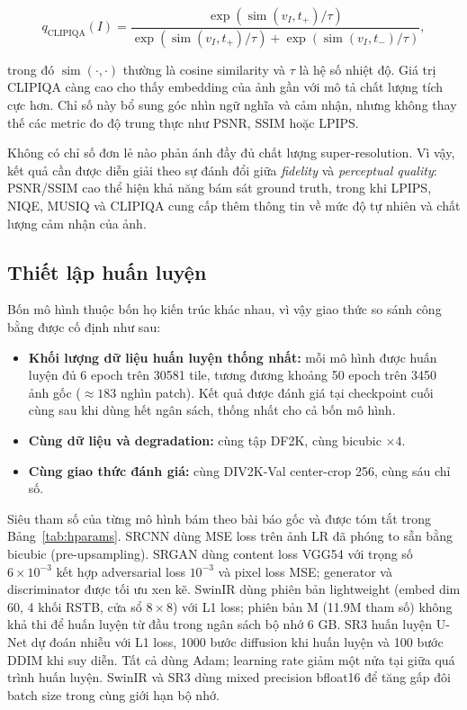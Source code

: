 \begin{equation}
q_{\mathrm{CLIPIQA}}(I)
=\frac{\exp\!\left(\operatorname{sim}(v_I,t_{+})/\tau\right)}
{\exp\!\left(\operatorname{sim}(v_I,t_{+})/\tau\right)
+\exp\!\left(\operatorname{sim}(v_I,t_{-})/\tau\right)},
\end{equation}

trong đó $\operatorname{sim}(\cdot,\cdot)$ thường là cosine similarity và $\tau$
là hệ số nhiệt độ. Giá trị CLIPIQA càng cao cho thấy embedding của ảnh gần với
mô tả chất lượng tích cực hơn. Chỉ số này bổ sung góc nhìn ngữ nghĩa và cảm
nhận, nhưng không thay thế các metric đo độ trung thực như PSNR, SSIM hoặc LPIPS.


Không có chỉ số đơn lẻ nào phản ánh đầy đủ chất lượng super-resolution. Vì vậy,
kết quả cần được diễn giải theo sự đánh đổi giữa \textit{fidelity} và
\textit{perceptual quality}: PSNR/SSIM cao thể hiện khả năng bám sát ground
truth, trong khi LPIPS, NIQE, MUSIQ và CLIPIQA cung cấp thêm thông tin về mức độ
tự nhiên và chất lượng cảm nhận của ảnh.

\subsection{Thiết lập huấn luyện}
\label{sec:training-setup}

Bốn mô hình thuộc bốn họ kiến trúc khác nhau, vì vậy giao thức so sánh công bằng
được cố định như sau:

\begin{itemize}
\item \textbf{Khối lượng dữ liệu huấn luyện thống nhất:} mỗi mô hình được huấn
      luyện đủ 6 epoch trên 30581 tile, tương đương khoảng 50 epoch trên 3450 ảnh
      gốc ($\approx 183$ nghìn patch). Kết quả được đánh giá tại checkpoint cuối
      cùng sau khi dùng hết ngân sách, thống nhất cho cả bốn mô hình.
\item \textbf{Cùng dữ liệu và degradation:} cùng tập DF2K, cùng bicubic $\times 4$.
\item \textbf{Cùng giao thức đánh giá:} cùng DIV2K-Val center-crop 256, cùng sáu
      chỉ số.
\end{itemize}

Siêu tham số của từng mô hình bám theo bài báo gốc và được tóm tắt trong
Bảng~\ref{tab:hparams}. SRCNN dùng MSE loss trên ảnh LR đã phóng to sẵn bằng
bicubic (pre-upsampling). SRGAN dùng content loss VGG54 với trọng số
$6 \times 10^{-3}$ kết hợp adversarial loss $10^{-3}$ và pixel loss MSE; generator
và discriminator được tối ưu xen kẽ. SwinIR dùng phiên bản lightweight (embed dim
60, 4 khối RSTB, cửa sổ $8 \times 8$) với L1 loss; phiên bản M (11.9M tham số)
không khả thi để huấn luyện từ đầu trong ngân sách bộ nhớ 6 GB. SR3 huấn luyện
U-Net dự đoán nhiễu với L1 loss, 1000 bước diffusion khi huấn luyện và 100 bước
DDIM khi suy diễn. Tất cả dùng Adam; learning rate giảm một nửa tại giữa quá
trình huấn luyện. SwinIR và SR3 dùng mixed precision bfloat16 để tăng gấp đôi
batch size trong cùng giới hạn bộ nhớ.

